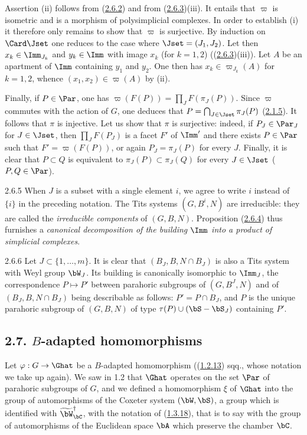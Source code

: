 \documentclass[12pt,a4paper,oneside,english]{smfart}
\makeatletter
\newcommand{\btanchor}[1]{\leavevmode\Hy@raisedlink{\hypertarget{bt:#1}{}}}
\newcommand{\btpageanchor}[1]{\Hy@raisedlink{\hypertarget{p:#1}{}}}
\newcommand{\btref}[1]{\hyperlink{bt:#1}{#1}}
\newcommand{\btpage}[1]{\marginnote{p.~#1}\btpageanchor{#1}}
\newcommand{\pagemark}[1]{\btpage{#1}}
\newcommand{\btsecB}[2]{%
  \par\needspace{4\baselineskip}\phantomsection
  \subsection*{#2}%
  \ifx\relax#1\relax\else\btanchor{#1}\fi}
\theoremstyle{definition}
\theoremstyle{bt}
\makeatother
\begin{document}
\medskip
Assertion (ii) follows from (\btref{2.6.2}) and from (\btref{2.6.3})(iii). It entails that
$\varpi$ is isometric and is a morphism of polysimplicial complexes. In order
to establish (i) it therefore only remains to show that $\varpi$ is
surjective. By induction on $\Card\Jset$ one reduces to the case where
$\Jset=(J_1,J_2)$. Let then $x_k\in\Imm_{J_k}$ and $y_k\in\Imm$ with image
$x_k$ (for $k=1,2$) ((\btref{2.6.3})(iii)). Let $A$ be an apartment of $\Imm$
containing $y_1$ and $y_2$. One then has $x_k\in\varpi_{J_k}(A)$ for $k=1,2$,
whence $(x_1,x_2)\in\varpi(A)$ by (ii).

Finally, if $P\in\Par$, one has $\varpi(F(P))=\prod_J F(\pi_J(P))$. Since
$\varpi$ commutes with the action of $G$, one deduces that
$P=\bigcap_{J\in\Jset}\pi_J(P)$ (\btref{2.1.5}). It follows that $\pi$ is injective.
Let us show that $\pi$ is surjective: indeed, if $P_J\in\Par_J$ for
$J\in\Jset$, then $\prod_J F(P_J)$ is a facet $F'$ of $\Imm'$ and there exists
$P\in\Par$ such that $F'=\varpi(F(P))$, or again $P_J=\pi_J(P)$ for every $J$.
Finally, it is clear that $P\subset Q$ is equivalent to
$\pi_J(P)\subset\pi_J(Q)$ for every $J\in\Jset$ ($P,Q\in\Par$).

\num{2.6.5}\btanchor{2.6.5}
When $J$ is a subset with a single element $i$, we agree to write $i$ instead
of $\{i\}$ in the preceding notation. The Tits systems $(G,B^i,N)$ are
irreducible:
\pagemark{49}
they are called the \emph{irreducible components} of $(G,B,N)$. Proposition
(\btref{2.6.4}) thus furnishes a \emph{canonical decomposition of the building $\Imm$
into a product of simplicial complexes}.

\num{2.6.6}\btanchor{2.6.6}
Let $J\subset\{1,\dots,m\}$. It is clear that $(B_J,B,N\cap B_J)$ is also a
Tits system with Weyl group $\bW_J$. Its building is canonically isomorphic to
$\Imm_J$, the correspondence $P\mapsto P'$ between parahoric subgroups of
$(G,B^J,N)$ and of $(B_J,B,N\cap B_J)$ being describable as follows:
$P'=P\cap B_J$, and $P$ is the unique parahoric subgroup of $(G,B,N)$ of type
$\tau(P)\cup(\bS-\bS_J)$ containing $P'$.


\btsecB{2.7}{2.7. \texorpdfstring{$B$}{B}-adapted homomorphisms}


Let $\varphi:G\to\Ghat$ be a $B$-adapted homomorphism ((\btref{1.2.13}) sqq., whose
notation we take up again). We saw in 1.2 that $\Ghat$ operates on the set
$\Par$ of parahoric subgroups of $G$, and we defined a homomorphism $\xi$ of
$\Ghat$ into the group of automorphisms of the Coxeter system $(\bW,\bS)$, a
group which is identified with $\widetilde{\bW}^{\dagger}_{\bC}$, with the
notation of (\btref{1.3.18}), that is to say with the group of automorphisms of the
Euclidean space $\bA$ which preserve the chamber $\bC$.
\end{document}
